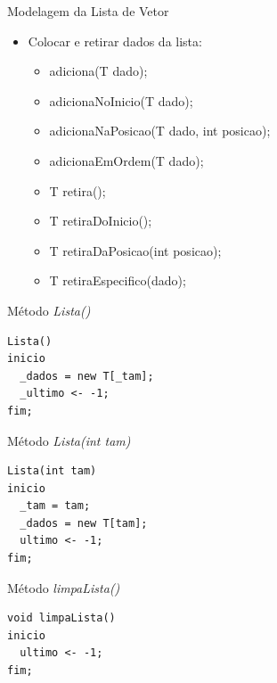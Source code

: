 \documentclass[12pt,table,xcolor={dvipsnames}]{beamer}
\begin{document}
\begin{frame}[fragile]{Modelagem da Lista de Vetor}

\begin{itemize}
\item Colocar e retirar dados da lista:
\begin{itemize}
\item adiciona(T dado);
\item adicionaNoInicio(T dado);
\item adicionaNaPosicao(T dado, int posicao);
\item adicionaEmOrdem(T dado);
\item T retira();
\item T retiraDoInicio();
\item T retiraDaPosicao(int posicao);
\item T retiraEspecifico(dado);
\end{itemize}
\end{itemize}
\end{frame}

\begin{frame}[fragile]{Método \textit{Lista()}}
\begin{lstlisting}
Lista()
inicio
  _dados = new T[_tam];
  _ultimo <- -1;
fim;
\end{lstlisting}
\end{frame}

\begin{frame}[fragile]{Método \textit{Lista(int tam)}}
\begin{lstlisting}
Lista(int tam)
inicio
  _tam = tam;
  _dados = new T[tam];
  ultimo <- -1;
fim;
\end{lstlisting}
\end{frame}

\begin{frame}[fragile]{Método \textit{limpaLista()}}
\begin{lstlisting}
void limpaLista()
inicio
  ultimo <- -1;
fim;
\end{lstlisting}
\end{frame}
\end{document}
